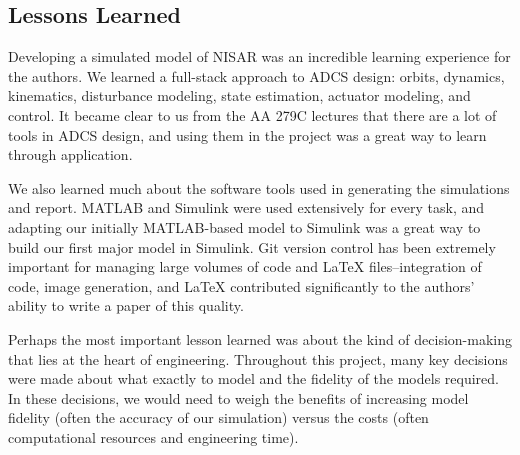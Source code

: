 \subsection{Lessons Learned}
Developing a simulated model of NISAR was an incredible learning experience for the authors. We learned a full-stack approach to ADCS design: orbits, dynamics, kinematics, disturbance modeling, state estimation, actuator modeling, and control. It became clear to us from the AA 279C lectures that there are a lot of tools in ADCS design, and using them in the project was a great way to learn through application.

We also learned much about the software tools used in generating the simulations and report. MATLAB and Simulink were used extensively for every task, and adapting our initially MATLAB-based model to Simulink was a great way to build our first major model in Simulink. Git version control has been extremely important for managing large volumes of code and \LaTeX{} files–integration of code, image generation, and \LaTeX{} contributed significantly to the authors' ability to write a paper of this quality.

Perhaps the most important lesson learned was about the kind of decision-making that lies at the heart of engineering. Throughout this project, many key decisions were made about what exactly to model and the fidelity of the models required. In these decisions, we would need to weigh the benefits of increasing model fidelity (often the accuracy of our simulation) versus the costs (often computational resources and engineering time).